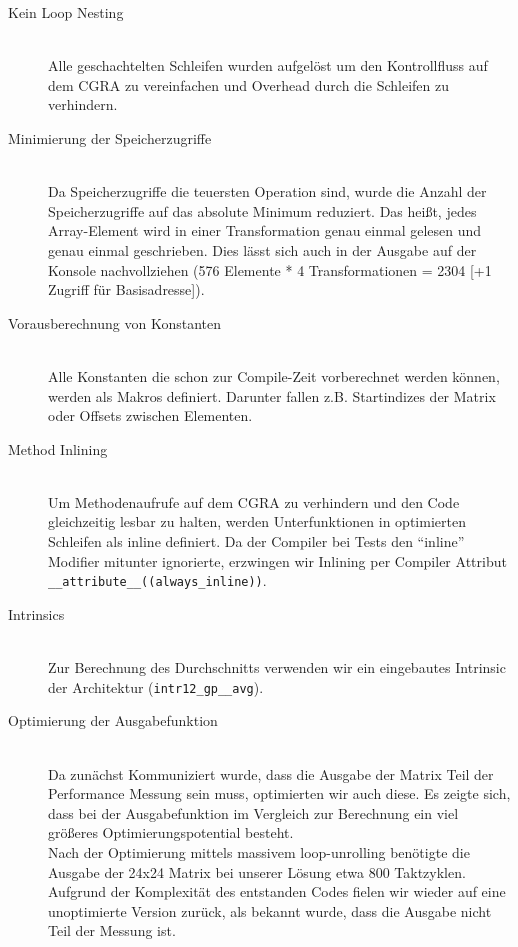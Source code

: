 \documentclass[oneside,11pt,accentcolor=tud2b, nochapname]{tudexercise}
\begin{document}
\begin{description}	
	\item[Kein Loop Nesting] \hfill \\
	Alle geschachtelten Schleifen wurden aufgelöst um den Kontrollfluss auf dem CGRA zu vereinfachen und Overhead durch die Schleifen zu verhindern.\\
	
	\item[Minimierung der Speicherzugriffe] \hfill \\
	Da Speicherzugriffe die teuersten Operation sind, wurde die Anzahl der Speicherzugriffe auf das absolute Minimum reduziert.
	Das heißt, jedes Array-Element wird in einer Transformation genau einmal gelesen und genau einmal geschrieben.
	Dies lässt sich auch in der Ausgabe auf der Konsole nachvollziehen (576 Elemente * 4 Transformationen = 2304 [+1 Zugriff für Basisadresse]).\\
	
	\item[Vorausberechnung von Konstanten] \hfill \\
	Alle Konstanten die schon zur Compile-Zeit vorberechnet werden können, werden als Makros definiert. 
	Darunter fallen z.B. Startindizes der Matrix oder Offsets zwischen Elementen.\\
	
	\item[Method Inlining] \hfill \\
	Um Methodenaufrufe auf dem CGRA zu verhindern und den Code gleichzeitig lesbar zu halten, werden Unterfunktionen in optimierten Schleifen als inline definiert.
	Da der Compiler bei Tests den "`inline"' Modifier mitunter ignorierte, erzwingen wir  Inlining per Compiler Attribut \texttt{\_\_attribute\_\_((always\_inline))}.\\
	
	\item[Intrinsics] \hfill \\
	Zur Berechnung des Durchschnitts verwenden wir ein eingebautes Intrinsic der Architektur (\texttt{intr12\_gp\_\_avg}).\\
	
	\item[Optimierung der Ausgabefunktion] \hfill \\
	Da zunächst Kommuniziert wurde, dass die Ausgabe der Matrix Teil der Performance Messung sein muss, optimierten wir auch diese.
	Es zeigte sich, dass bei der Ausgabefunktion im Vergleich zur Berechnung ein viel größeres Optimierungspotential besteht.\\
	Nach der Optimierung mittels massivem loop-unrolling benötigte die Ausgabe der 24x24 Matrix bei unserer Lösung etwa 800 Taktzyklen.
	Aufgrund der Komplexität des entstanden Codes fielen wir wieder auf eine unoptimierte Version zurück, als bekannt wurde, dass die Ausgabe nicht Teil der Messung ist.
	
\end{description}
\end{document}
